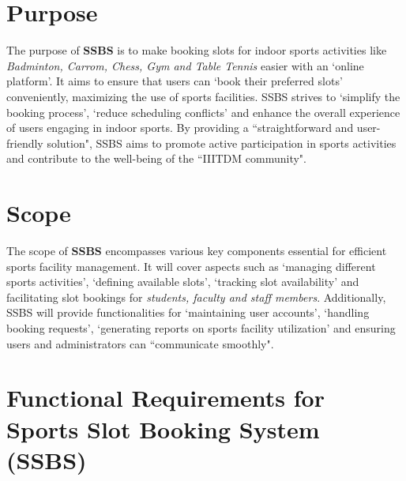 \documentclass[12pt]{article}
\begin{document}
\vspace{0.4cm}

\section{Purpose}
\hspace{0.8cm} The purpose of \textbf{SSBS} is to make booking slots for indoor sports activities like \textit{Badminton, Carrom, Chess, Gym and Table Tennis} easier with an `online platform'. It aims to ensure that users can `book their preferred slots' conveniently, maximizing the use of sports facilities. SSBS strives to `simplify the booking process', `reduce scheduling conflicts' and enhance the overall experience of users engaging in indoor sports. By providing a ``straightforward and user-friendly solution", SSBS aims to promote active participation in sports activities and contribute to the well-being of the ``IIITDM community".

\vspace*{0.4cm}

\section{Scope}
\hspace{0.8cm} The scope of \textbf{SSBS} encompasses various key components essential for efficient sports facility management. It will cover aspects such as `managing different sports activities', `defining available slots', `tracking slot availability' and facilitating slot bookings for \textit{students, faculty and staff members}. Additionally, SSBS will provide functionalities for `maintaining user accounts', `handling booking requests', `generating reports on sports facility utilization' and ensuring users and administrators can ``communicate smoothly".

\vspace{0.4cm}

\section{Functional Requirements for Sports Slot Booking System (SSBS)}
\end{document}
